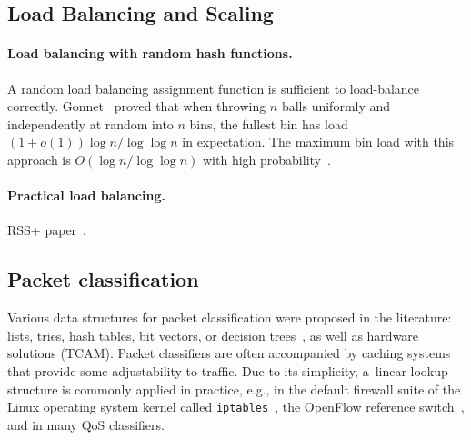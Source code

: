 \subsection{Load Balancing and Scaling}

\paragraph*{Load balancing with random hash functions.}
A random load balancing assignment function is sufficient to load-balance correctly.
Gonnet~\cite{Gonnet81} proved that when throwing $n$ balls uniformly and independently at random into $n$ bins, the fullest bin has
load $(1 + o(1)) \log n/ \log \log n$ in expectation.
The maximum bin load with this approach is $O(\log n/ \log \log n)$ with high probability~\cite{DubhashiR98}.

\paragraph*{Practical load balancing.}
RSS+ paper~\cite{BarbetteKMK19}.

\subsection{Packet classification}

Various data structures for packet classification were proposed in the literature: lists, tries, hash tables, bit vectors, or decision trees~\cite{gupta2001algorithms,Srinivasan1999,Eppstein2001}, as well as hardware solutions (TCAM).
Packet classifiers are often accompanied by caching systems that provide some adjustability to traffic.
Due to its simplicity, a~linear lookup structure is commonly applied in practice, e.g., in the default firewall suite of the Linux operating system kernel called \texttt{iptables}~\cite{MianoBRBLP19}, the OpenFlow reference switch~\cite{openflow}, and in many QoS classifiers.
















